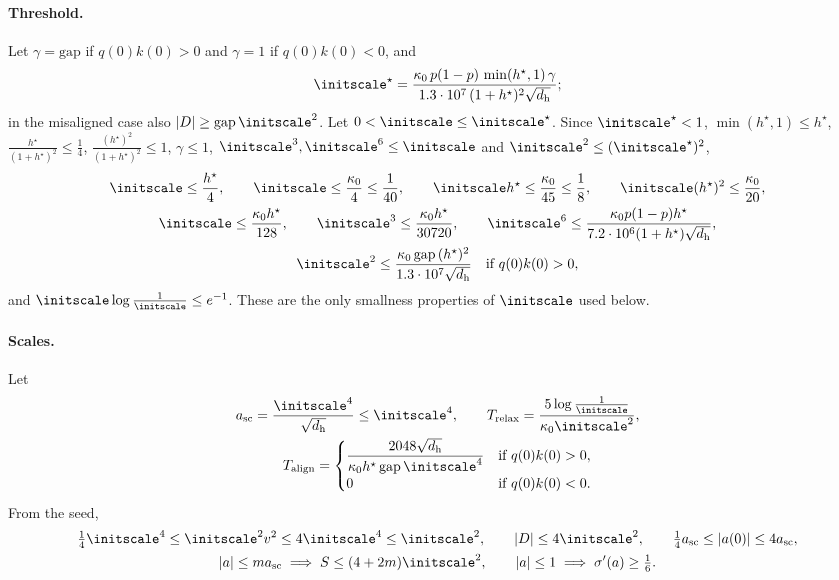 \paragraph{Threshold.} Let $\gamma=\mathrm{gap}$ if $q(0)k(0)>0$ and $\gamma=1$ if $q(0)k(0)<0$, and
\[
 \initscale^\star=\frac{\kappa_0\,p(1-p)\,\min(h^\star,1)\,\gamma}{1.3\cdot10^7\,(1+h^\star)^2\sqrt{d_{\mathrm h}}} ;
\]
in the misaligned case also $|D|\ge\mathrm{gap}\,\initscale^2$. Let $0<\initscale\le\initscale^\star$. Since $\initscale^\star<1$, $\min(h^\star,1)\le h^\star$,
$\frac{h^\star}{(1+h^\star)^2}\le\frac{1}{4}$, $\frac{(h^\star)^2}{(1+h^\star)^2}\le1$, $\gamma\le1$, $\initscale^3,\initscale^6\le\initscale$ and $\initscale^2\le(\initscale^\star)^2$,
\begin{equation}
 \begin{gathered}
 \initscale\le\frac{h^\star}{4},\qquad \initscale\le\frac{\kappa_0}{4}\le\frac{1}{40},\qquad \initscale h^\star\le\frac{\kappa_0}{45}\le\frac{1}{8},\qquad
 \initscale(h^\star)^2\le\frac{\kappa_0}{20},\\
 \initscale\le\frac{\kappa_0h^\star}{128},\qquad \initscale^3\le\frac{\kappa_0h^\star}{30720},\qquad
 \initscale^6\le\frac{\kappa_0p(1-p)h^\star}{7.2\cdot10^6(1+h^\star)\sqrt{d_{\mathrm h}}},\\
 \initscale^2\le\frac{\kappa_0\,\mathrm{gap}\,(h^\star)^2}{1.3\cdot10^7\sqrt{d_{\mathrm h}}}\quad\text{if }q(0)k(0)>0,
 \end{gathered}
 \label{eq:J-eps}
\end{equation}
and $\initscale\log\frac{1}{\initscale}\le e^{-1}$. These are the only smallness properties of $\initscale$ used below.

\paragraph{Scales.} Let
\begin{gather*}
 a_{\mathrm{sc}}=\frac{\initscale^4}{\sqrt{d_{\mathrm h}}}\le\initscale^4,\qquad
 T_{\mathrm{relax}}=\frac{5\log\frac{1}{\initscale}}{\kappa_0\initscale^2},\\
 T_{\mathrm{align}}=\begin{cases}\dfrac{2048\sqrt{d_{\mathrm h}}}{\kappa_0h^\star\,\mathrm{gap}\,\initscale^4}&\text{if }q(0)k(0)>0,\\0&\text{if }q(0)k(0)<0.\end{cases}
\end{gather*}
From the seed,
\begin{equation}
 \begin{gathered}
 \tfrac{1}{4}\initscale^4\le \initscale^2v^2\le4\initscale^4\le\initscale^2,\qquad |D|\le4\initscale^2,\qquad \tfrac{1}{4}a_{\mathrm{sc}}\le|a(0)|\le4a_{\mathrm{sc}},\\
 |a|\le ma_{\mathrm{sc}}\implies S\le(4+2m)\initscale^2,\qquad |a|\le1\implies\sigma'(a)\ge\tfrac{1}{6} .
 \end{gathered}
 \label{eq:J-scales}
\end{equation}


